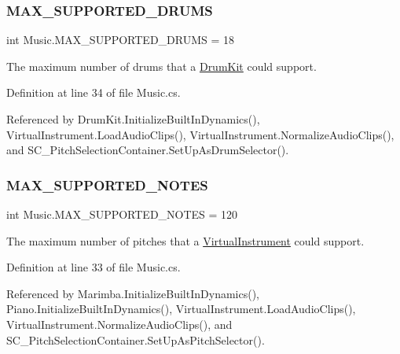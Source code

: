 \subsubsection{\texorpdfstring{M\+A\+X\+\_\+\+S\+U\+P\+P\+O\+R\+T\+E\+D\+\_\+\+D\+R\+U\+MS}{MAX\_SUPPORTED\_DRUMS}}
{\footnotesize\ttfamily int Music.\+M\+A\+X\+\_\+\+S\+U\+P\+P\+O\+R\+T\+E\+D\+\_\+\+D\+R\+U\+MS = 18\hspace{0.3cm}{\ttfamily [static]}}



The maximum number of drums that a \hyperlink{class_drum_kit}{Drum\+Kit} could support. 



Definition at line 34 of file Music.\+cs.



Referenced by Drum\+Kit.\+Initialize\+Built\+In\+Dynamics(), Virtual\+Instrument.\+Load\+Audio\+Clips(), Virtual\+Instrument.\+Normalize\+Audio\+Clips(), and S\+C\+\_\+\+Pitch\+Selection\+Container.\+Set\+Up\+As\+Drum\+Selector().

\mbox{\label{group___music_constants_gaaf07da909a12e9fec0e43b70864f27b7}} 
\subsubsection{\texorpdfstring{M\+A\+X\+\_\+\+S\+U\+P\+P\+O\+R\+T\+E\+D\+\_\+\+N\+O\+T\+ES}{MAX\_SUPPORTED\_NOTES}}
{\footnotesize\ttfamily int Music.\+M\+A\+X\+\_\+\+S\+U\+P\+P\+O\+R\+T\+E\+D\+\_\+\+N\+O\+T\+ES = 120\hspace{0.3cm}{\ttfamily [static]}}



The maximum number of pitches that a \hyperlink{class_virtual_instrument}{Virtual\+Instrument} could support. 



Definition at line 33 of file Music.\+cs.



Referenced by Marimba.\+Initialize\+Built\+In\+Dynamics(), Piano.\+Initialize\+Built\+In\+Dynamics(), Virtual\+Instrument.\+Load\+Audio\+Clips(), Virtual\+Instrument.\+Normalize\+Audio\+Clips(), and S\+C\+\_\+\+Pitch\+Selection\+Container.\+Set\+Up\+As\+Pitch\+Selector().

